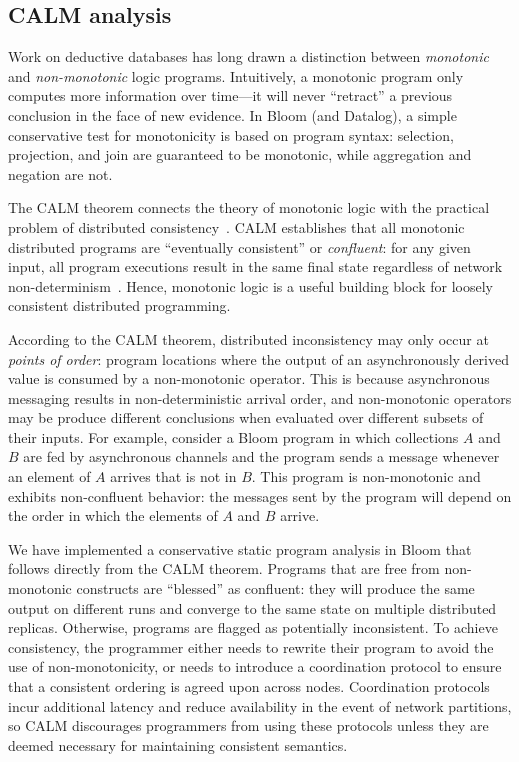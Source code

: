 \subsection{CALM analysis}
\label{sec:bg-calm}

Work on deductive databases has long drawn a distinction between
\emph{monotonic} and \emph{non-monotonic} logic programs. Intuitively, a
monotonic program only computes more information over time---it will never
``retract'' a previous conclusion in the face of new evidence.  In Bloom (and
Datalog), a simple conservative test for monotonicity is based on program
syntax: selection, projection, and join are guaranteed to be monotonic, while aggregation and negation are not.

The CALM theorem connects the theory of monotonic logic with the practical
problem of distributed consistency~\cite{Alvaro2011,podskey}.  CALM establishes that all
monotonic distributed programs are ``eventually consistent'' or
\emph{confluent}: for any given input, all program executions result in the same
final state regardless of network
non-determinism~\cite{Ameloot2011,marczak2012}.  Hence, monotonic logic is
a useful building block for loosely consistent distributed programming.

According to the CALM theorem, distributed inconsistency may only occur at
\emph{points of order}: program locations where the output of an asynchronously
derived value is consumed by a non-monotonic operator.  This is because
asynchronous messaging results in non-deterministic arrival order, and
non-monotonic operators may be produce different conclusions when evaluated over
different subsets of their inputs.  For example, consider a Bloom program in
which collections $A$ and $B$ are fed by asynchronous channels and the program
sends a message whenever an element of $A$ arrives that is not in $B$. This
program is non-monotonic and exhibits non-confluent behavior: the messages sent
by the program will depend on the order in which the elements of $A$ and $B$
arrive.

We have implemented a conservative static program analysis in Bloom that follows
directly from the CALM theorem.  Programs that are free from non-monotonic
constructs are ``blessed'' as confluent: they will produce the same output on different
runs and converge to the same state on multiple distributed replicas.
Otherwise, programs are flagged as potentially inconsistent.  To achieve
consistency, the programmer either needs to rewrite their program to avoid the
use of non-monotonicity, or needs to introduce a coordination protocol to ensure that a
consistent ordering is agreed upon across nodes. Coordination protocols incur additional
latency and reduce availability in the event of network partitions, so CALM discourages programmers from using these protocols unless they are deemed necessary for maintaining consistent semantics.

